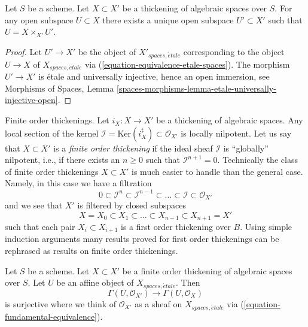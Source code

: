 \begin{lemma}
\label{lemma-open-subspace-thickening}
Let $S$ be a scheme. Let $X \subset X'$ be a thickening
of algebraic spaces over $S$. For any open subspace $U \subset X$ there
exists a unique open subspace $U' \subset X'$ such that
$U = X \times_{X'} U'$.
\end{lemma}

\begin{proof}
Let $U' \to X'$ be the object of $X'_{spaces, \acute{e}tale}$
corresponding to the object $U \to X$ of $X_{spaces, \acute{e}tale}$
via (\ref{equation-equivalence-etale-spaces}). The morphism
$U' \to X'$ is \'etale and universally injective, hence an open immersion, see
Morphisms of Spaces,
Lemma \ref{spaces-morphisms-lemma-etale-universally-injective-open}.
\end{proof}

\noindent
Finite order thickenings. Let $i_X : X \to X'$ be a thickening of
algebraic spaces. Any local section of the kernel
$\mathcal{I} = \text{Ker}(i_X^\sharp) \subset \mathcal{O}_{X'}$ is
locally nilpotent.
Let us say that $X \subset X'$ is a {\it finite order thickening}
if the ideal sheaf $\mathcal{I}$ is ``globally'' nilpotent, i.e.,
if there exists an $n \geq 0$ such that $\mathcal{I}^{n + 1} = 0$.
Technically the class of finite order thickenings $X \subset X'$
is much easier to handle than the general case.
Namely, in this case we have a filtration
$$
0 \subset \mathcal{I}^n \subset \mathcal{I}^{n - 1} \subset
\ldots \subset \mathcal{I} \subset \mathcal{O}_{X'}
$$
and we see that $X'$ is filtered by closed subspaces
$$
X = X_0 \subset X_1 \subset \ldots \subset X_{n - 1} \subset X_{n + 1} = X'
$$
such that each pair $X_i \subset X_{i + 1}$ is a first order thickening
over $B$. Using simple induction arguments many results proved for first order
thickenings can be rephrased as results on finite order thickenings.

\begin{lemma}
\label{lemma-first-order-thickening-surjective}
Let $S$ be a scheme. Let $X \subset X'$ be a finite order thickening
of algebraic spaces over $S$. Let $U$ be an affine object of
$X_{spaces, \acute{e}tale}$. Then
$$
\Gamma(U, \mathcal{O}_{X'}) \to \Gamma(U, \mathcal{O}_X)
$$
is surjective where we think of $\mathcal{O}_{X'}$ as a sheaf on
$X_{spaces, \acute{e}tale}$ via (\ref{equation-fundamental-equivalence}).
\end{lemma}

